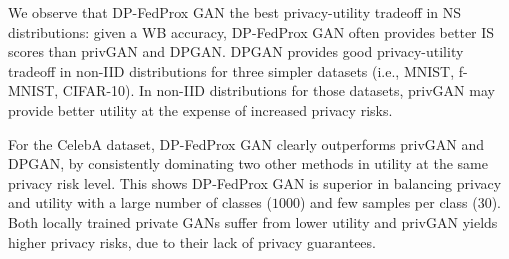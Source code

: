 \documentclass[conference]{IEEEtran}
\begin{document}


We observe that DP-FedProx GAN the best privacy-utility tradeoff in NS distributions: given a WB accuracy, DP-FedProx GAN often provides better IS scores than privGAN and DPGAN.   DPGAN provides good privacy-utility tradeoff in non-IID distributions for three simpler datasets (i.e., MNIST, f-MNIST, CIFAR-10).  In non-IID distributions for those datasets, privGAN may provide better utility at the expense of increased privacy risks.   



For the CelebA dataset, DP-FedProx GAN clearly outperforms privGAN and DPGAN, by consistently dominating two other methods in utility at the same privacy risk level.  This shows DP-FedProx GAN is superior in balancing privacy and utility with a large number of classes ($1000$) and few samples per class ($30$).    Both locally trained private GANs suffer from lower utility and privGAN yields higher privacy risks, due to their lack of privacy guarantees.  


\end{document}
